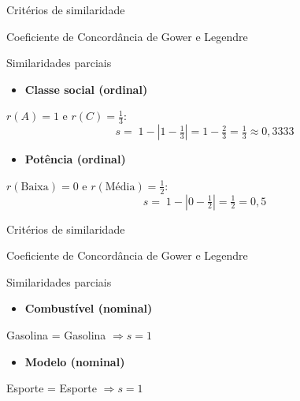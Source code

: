 \documentclass[
  ignorenonframetext,
  aspectratio=169,
]{beamer}
\providecommand{\tightlist}{%
  \setlength{\itemsep}{0pt}\setlength{\parskip}{0pt}}
\begin{document}
\begin{frame}{Critérios de similaridade}
\protect{}\label{crituxe9rios-de-similaridade-17}
\begin{block}{Coeficiente de Concordância de Gower e Legendre}
\protect{}\label{coeficiente-de-concorduxe2ncia-de-gower-e-legendre-10}
\begin{block}{Similaridades parciais}
\protect{}\label{similaridades-parciais-1}
\begin{itemize}
\tightlist
\item
  \textbf{Classe social (ordinal)}
\end{itemize}

\(r(A)=1\) e \(r(C)=\tfrac{1}{3}\): \[
s=\;1-\left|1-\tfrac{1}{3}\right|=1-\tfrac{2}{3}=\tfrac{1}{3}\approx 0,3333
\]

\begin{itemize}
\tightlist
\item
  \textbf{Potência (ordinal)}
\end{itemize}

\(r(\text{Baixa})=0\) e \(r(\text{Média})=\tfrac{1}{2}\): \[
s=\;1-\left|0-\tfrac{1}{2}\right|=\tfrac{1}{2}=0,5
\]
\end{block}
\end{block}
\end{frame}

\begin{frame}{Critérios de similaridade}
\protect{}\label{crituxe9rios-de-similaridade-18}
\begin{block}{Coeficiente de Concordância de Gower e Legendre}
\protect{}\label{coeficiente-de-concorduxe2ncia-de-gower-e-legendre-11}
\begin{block}{Similaridades parciais}
\protect{}\label{similaridades-parciais-2}
\begin{itemize}
\tightlist
\item
  \textbf{Combustível (nominal)}
\end{itemize}

Gasolina = Gasolina \(\Rightarrow s=1\)

\begin{itemize}
\tightlist
\item
  \textbf{Modelo (nominal)}
\end{itemize}

Esporte = Esporte \(\Rightarrow s=1\)
\end{block}
\end{block}
\end{frame}
\end{document}
